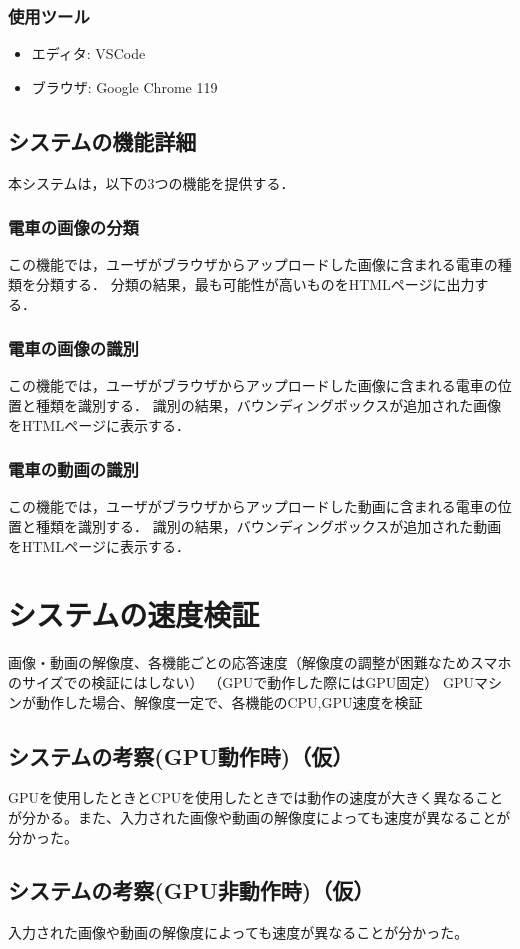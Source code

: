 \begin{multicols*}{2}
\subsubsection{使用ツール} 
\begin{itemize} 
	\item エディタ: VSCode 
	\item ブラウザ: Google Chrome 119 
\end{itemize}

\subsection{システムの機能詳細} 本システムは，以下の3つの機能を提供する．
\subsubsection{電車の画像の分類} この機能では，ユーザがブラウザからアップロードした画像に含まれる電車の種類を分類する． 分類の結果，最も可能性が高いものをHTMLページに出力する．
\subsubsection{電車の画像の識別} この機能では，ユーザがブラウザからアップロードした画像に含まれる電車の位置と種類を識別する．  識別の結果，バウンディングボックスが追加された画像をHTMLページに表示する．
\subsubsection{電車の動画の識別} この機能では，ユーザがブラウザからアップロードした動画に含まれる電車の位置と種類を識別する． 識別の結果，バウンディングボックスが追加された動画をHTMLページに表示する．


\section{システムの速度検証}
画像・動画の解像度、各機能ごとの応答速度（解像度の調整が困難なためスマホのサイズでの検証にはしない）
（GPUで動作した際にはGPU固定）
GPUマシンが動作した場合、解像度一定で、各機能のCPU,GPU速度を検証
\subsection{システムの考察(GPU動作時)（仮）}
GPUを使用したときとCPUを使用したときでは動作の速度が大きく異なることが分かる。また、入力された画像や動画の解像度によっても速度が異なることが分かった。
\subsection{システムの考察(GPU非動作時)（仮）}
入力された画像や動画の解像度によっても速度が異なることが分かった。

\end{multicols*}
